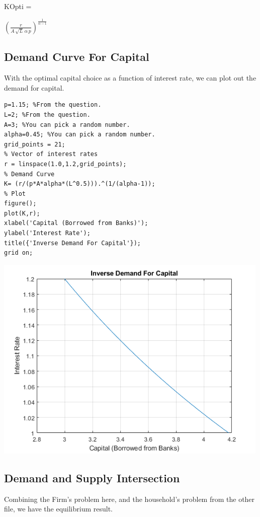 \documentclass[
]{book}
\begin{document}
KOpti =

\(\displaystyle {{\left(\frac{r}{A\,\sqrt{L}\,\alpha \,p}\right)}}^{\frac{1}{\alpha -1}}\)

\hypertarget{demand-curve-for-capital}{%
\subsection{Demand Curve For Capital}\label{demand-curve-for-capital}}

With the optimal capital choice as a function of interest rate, we can
plot out the demand for capital.

\begin{verbatim}
p=1.15; %From the question.
L=2; %From the question.
A=3; %You can pick a random number.
alpha=0.45; %You can pick a random number.
grid_points = 21;
% Vector of interest rates
r = linspace(1.0,1.2,grid_points);
% Demand Curve
K= (r/(p*A*alpha*(L^0.5))).^(1/(alpha-1));
% Plot
figure();
plot(K,r);
xlabel('Capital (Borrowed from Banks)');
ylabel('Interest Rate');
title({'Inverse Demand For Capital'});
grid on;
\end{verbatim}

\includegraphics[width=5.20833in,height=\textheight]{img/K_borrow_firm_images/figure_1.png}

\hypertarget{demand-and-supply-intersection}{%
\subsection{Demand and Supply Intersection}\label{demand-and-supply-intersection}}

Combining the Firm's problem here, and the household's problem from the
other file, we have the equilibrium result.
\end{document}
